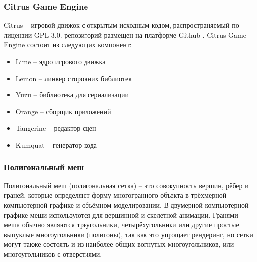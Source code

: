 \documentclass{fefu}
\begin{document}
\subsubsection{Citrus Game Engine}
Citrus -- игровой движок с открытым исходным кодом, распространяемый по лицензии GPL-3.0.
репозиторий размещен на платформе Github \cite{CitrusRepo}. Citrus Game Engine
состоит из следующих компонент:
\begin{itemize}
    \item Lime -- ядро игрового движка
    \item Lemon -- линкер сторонних библиотек
    \item Yuzu -- библиотека для сериализации
    \item Orange -- сборщик приложений
    \item Tangerine -- редактор сцен
    \item Kumquat -- генератор кода
\end{itemize}
\subsubsection{Полигональный меш}
Полигональный меш (полигональная сетка) -- это совокупность вершин, рёбер и граней, которые определяют форму
многогранного объекта в трёхмерной компьютерной графике и объёмном моделировании. В двумерной компьютерной графике
меши используются для вершинной и скелетной анимации. Гранями меша обычно являются треугольники,
четырёхугольники или другие простые выпуклые многоугольники (полигоны), так как это упрощает рендеринг, но сетки могут
также состоять и из наиболее общих вогнутых многоугольников, или многоугольников с отверстиями.
\end{document}
